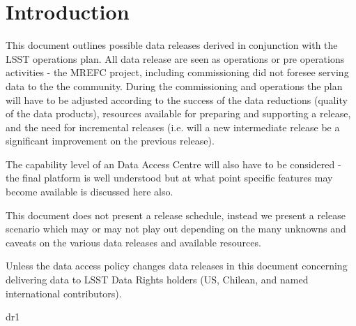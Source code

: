 \section{Introduction} \label{sec:intro}
This document outlines possible data
releases derived in conjunction with the LSST  operations plan.
All data release are seen as operations or pre operations activities - the MREFC project, including commissioning did not foresee serving data to the the community.
During the commissioning and operations  the plan will have to
be adjusted according to the success of the data reductions (quality of the data
products), resources available for preparing and supporting a release, and the need for incremental
releases (i.e. will a new intermediate release be a significant improvement on the previous
release).

The capability level of an Data Access Centre will also have to be considered - the final platform is well understood 
but at what point specific features may become available is discussed here also.

This document does not present a release schedule, instead we present a
release scenario which may or may not play out depending on the many unknowns and caveats
on the various data releases and available resources.

Unless the data access policy changes data releases in this document concerning delivering data to LSST Data Rights holders (US, Chilean, and named international contributors).




 {dr1}

%


